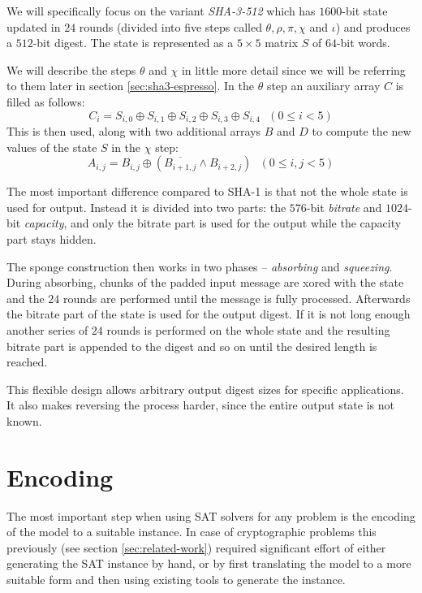 We will specifically focus on the variant \emph{SHA-3-512} which has $1600$-bit state updated in $24$ rounds (divided into five steps called $\theta, \rho, \pi, \chi$ and $\iota$) and produces a $512$-bit digest.
The state is represented as a $5\times 5$ matrix $S$ of $64$-bit words.

We will describe the steps $\theta$ and $\chi$ in little more detail since we will be referring to them later in section \ref{sec:sha3-espresso}.
In the $\theta$ step an auxiliary array $C$ is filled as follows:
\[
C_i = S_{i,0} \oplus S_{i,1} \oplus S_{i,2} \oplus S_{i,3} \oplus S_{i,4} ~~~ (0 \le i < 5)
\]
This is then used, along with two additional arrays $B$ and $D$ to compute the new values of the state $S$ in the $\chi$ step:
\[
A_{i,j} = B_{i,j} \oplus (\overline{B_{i+1,j}} \land B_{i+2,j}) ~~~ (0 \le i,j < 5)
\]

The most important difference compared to SHA-1 is that not the whole state is used for output.
Instead it is divided into two parts: the $576$-bit \emph{bitrate} and $1024$-bit \emph{capacity}, and only the bitrate part is used for the output while the capacity part stays hidden.

The sponge construction then works in two phases -- \emph{absorbing} and \emph{squeezing}.
During absorbing, chunks of the padded input message are xored with the state and the $24$ rounds are performed until the message is fully processed.
Afterwards the bitrate part of the state is used for the output digest.
If it is not long enough another series of $24$ rounds is performed on the whole state and the resulting bitrate part is appended to the digest and so on until the desired length is reached.

This flexible design allows arbitrary output digest sizes for specific applications.
It also makes reversing the process harder, since the entire output state is not known.

\section{Encoding}
The most important step when using SAT solvers for any problem is the encoding of the model to a suitable instance.
In case of cryptographic problems this previously (see section \ref{sec:related-work}) required significant effort of either generating the SAT instance by hand, or by first translating the model to a more suitable form and then using existing tools to generate the instance.

